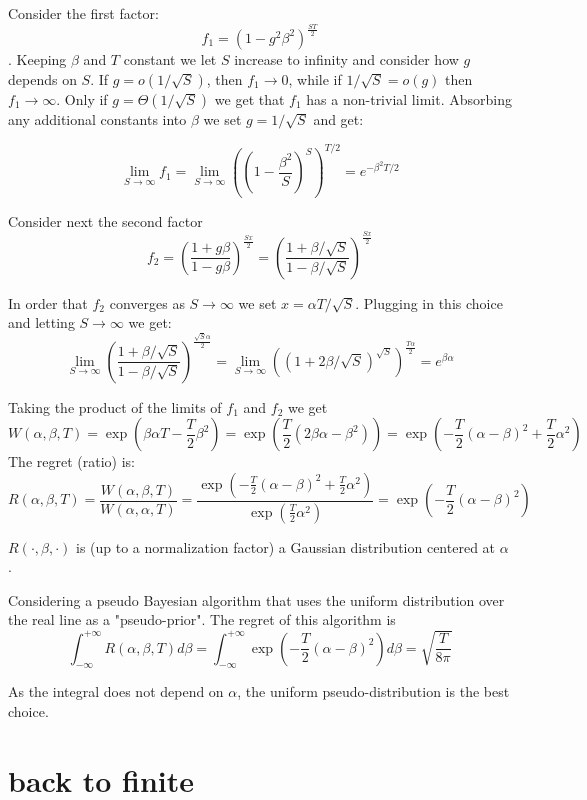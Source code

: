\documentclass{article}
\begin{document}
Consider the first factor:$$f_1=(1-g^2 \beta^2)^{\frac{ST}{2}}$$. Keeping $\beta$ and $T$ constant we let $S$ increase to infinity and consider how $g$ depends on $S$.  
If $g = o(1/\sqrt{S})$, then $f_1 \to 0$, while if $1/\sqrt{S} = o(g)$ then $f_1 \to \infty$. Only if $g = \Theta(1/\sqrt{S})$ we get that $f_1$ has a non-trivial limit.
Absorbing any additional constants into $\beta$ we set $g = 1/\sqrt{S}$ and get:

$$ \lim_{S \to \infty} f_1 = \lim_{S \to \infty} \left( \left(1-\frac{\beta^2}{S}\right)^S \right)^{T/2} = e^{-\beta^2 T / 2}$$

Consider next the second factor $$f_2 = \left( \frac{1+g\beta}{1-g \beta}\right)^{\frac{Sx}{2}} = \left( \frac{1+\beta/\sqrt{S}}{1- \beta/\sqrt{S}}\right)^{\frac{Sx}{2}}$$

In order that $f_2$ converges as $S \to \infty$ we set $x = \alpha T / \sqrt{S}$.
Plugging in this choice and letting $S \to \infty$ we get: 
\[
\lim_{S \to \infty} \left( \frac{1+\beta/\sqrt{S}}{1- \beta/\sqrt{S}}\right)^{\frac{\sqrt{S} \alpha}{2}} = 
\lim_{S \to \infty} \left(\left( 1+2 \beta/\sqrt{S}\right)^{\sqrt{S}} \right)^{\frac{T \alpha}{2}}
=e^{\beta\alpha}
\]

Taking the product of the limits of $f_1$ and $f_2$ we get
\[
W(\alpha,\beta,T) = \exp \left( \beta \alpha T - \frac{T}{2} \beta^2 \right)  =
\exp \left( \frac{T}{2} \left( 2 \beta \alpha - \beta^2 \right) \right) =
\exp \left( -\frac{T}{2} \left( \alpha - \beta \right)^2 + \frac{T}{2} \alpha^2 \right)
\]
The regret (ratio) is:
\[
R(\alpha,\beta,T) = \frac{W(\alpha,\beta,T)}{W(\alpha,\alpha,T)} = 
\frac{\exp \left( -\frac{T}{2} \left( \alpha - \beta \right)^2 + \frac{T}{2} \alpha^2 \right)}{\exp \left( \frac{T}{2} \alpha^2 \right)} = \exp \left( -\frac{T}{2} \left( \alpha - \beta \right)^2 \right)
\]

$R(\cdot,\beta,\cdot)$ is (up to a normalization factor) a Gaussian distribution centered at $\alpha$.

Considering a pseudo Bayesian algorithm that uses the uniform distribution over the real line as a "pseudo-prior". The regret of this algorithm is
\[\int_{-\infty}^{+\infty} R(\alpha,\beta,T) d\beta
= \int_{-\infty}^{+\infty} \exp \left( -\frac{T}{2} \left( \alpha - \beta \right)^2 \right) d\beta
= \sqrt{\frac{T}{8 \pi}}
\]

As the integral does not depend on $\alpha$, the uniform pseudo-distribution is the best choice.

\section{back to finite}
\end{document}
